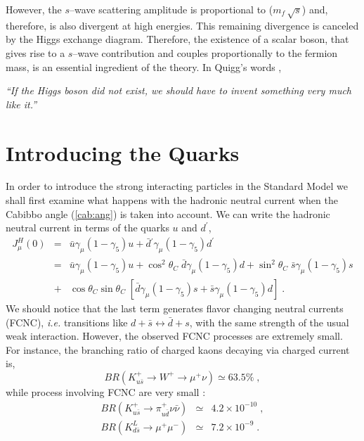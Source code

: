 \documentclass[12pt]{report}
\newcommand{\gc}{\gamma_5}
\newcommand{\g}{\gamma}
\begin{document}
\vskip 1cm
However, the $s$--wave scattering amplitude is  proportional to ($
m_f \, \sqrt{s}$) and, therefore, is also divergent at high energies.
This remaining divergence is canceled by the Higgs exchange diagram.
Therefore, the existence of a scalar boson, that gives rise to a
$s$--wave contribution and couples proportionally to the fermion mass,
is an essential ingredient of the theory. In Quigg's words
\cite{Quigg:83},

\begin{center}
\begin{minipage}[h]{12cm}
{\it ``If the Higgs boson did not exist, we should have to invent
something very much like it.''}
\end{minipage}
\end{center}


\newpage
\section{Introducing the Quarks} \indent 

In order to introduce the strong interacting particles in the
Standard Model we shall first examine what happens with the hadronic
neutral current when the Cabibbo angle (\ref{cab:ang}) is taken into
account.
We can write the hadronic neutral current in terms of the quarks $u$
and $d^\prime$,
\begin{eqnarray*}
J_\mu^H (0) &=& \bar{u} \g_\mu (1 - \gc) u + 
\bar{d} {}^\prime \g_\mu (1 - \gc) d^\prime
\\
&=&\bar{u} \g_\mu (1 - \gc) u + \cos^2\theta_C \; \bar{d} \g_\mu (1 - \gc) d
+ \sin^2\theta_C  \; \bar{s} \g_\mu (1 - \gc) s 
\\
&+& \cos\theta_C \sin\theta_C \; { 
\left[\bar{d} \g_\mu (1 - \gc) s + \bar{s} \g_\mu (1 - \gc) d \right]}
\; .
\end{eqnarray*}
We should notice that the last term generates flavor changing neutral
currents (FCNC), {\it i.e.} transitions like $d + \bar{s}
\leftrightarrow \bar{d} + s$, with the same strength of the usual
weak interaction. However, the observed FCNC processes are extremely
small. For instance, the branching ratio of charged kaons decaying
via charged current is,
\[
BR\left( K^+_{u\bar{s}} \to W^+ \to \mu^+ \nu\right) \simeq 63.5\% \; ,
\]
while process involving FCNC are very small \cite{pdg:98}:
\begin{eqnarray*}
BR\left(K^+_{u\bar{s}} \to \pi^+_{u\bar{d}} \nu \bar{\nu}
\right)  & \simeq &  4.2 \times 10^{-10} \; , \\
BR\left(K^L_{d\bar{s}} \to \mu^+ \mu^-\right) & \simeq & 7.2 
\times 10^{-9} \; .
\end{eqnarray*}
\end{document}
